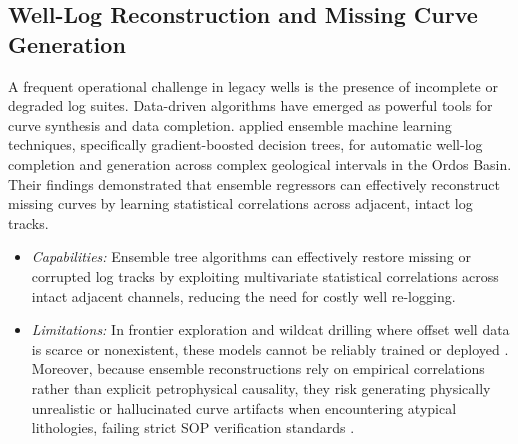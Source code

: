 \subsection{Well-Log Reconstruction and Missing Curve Generation}
A frequent operational challenge in legacy wells is the presence of incomplete or degraded log suites. Data-driven algorithms have emerged as powerful tools for curve synthesis and data completion. \citet{ref4} applied ensemble machine learning techniques, specifically gradient-boosted decision trees, for automatic well-log completion and generation across complex geological intervals in the Ordos Basin. Their findings demonstrated that ensemble regressors can effectively reconstruct missing curves by learning statistical correlations across adjacent, intact log tracks.
\begin{itemize}
    \item \textit{Capabilities:} Ensemble tree algorithms can effectively restore missing or corrupted log tracks by exploiting multivariate statistical correlations across intact adjacent channels, reducing the need for costly well re-logging.
    \item \textit{Limitations:} In frontier exploration and wildcat drilling where offset well data is scarce or nonexistent, these models cannot be reliably trained or deployed \citep{ref1}. Moreover, because ensemble reconstructions rely on empirical correlations rather than explicit petrophysical causality, they risk generating physically unrealistic or hallucinated curve artifacts when encountering atypical lithologies, failing strict SOP verification standards \citep{ref3}.
\end{itemize}


